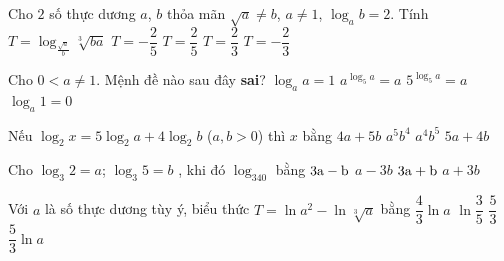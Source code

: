 \begin{ex}%
	Cho $2$ số thực dương $a$, $b$ thỏa mãn $\sqrt{a} \ne b$, $a\ne 1$, $\log_a b=2$. Tính $T=\log _{\tfrac{\sqrt{a}}{b}} \sqrt[3]{ba}$ 
	 \choice
		{$T=-\dfrac{2}{5}$} 
		{$T=\dfrac{2}{5}$} 
		 {$T=\dfrac{2}{3}$}
		 {\True $T=-\dfrac{2}{3}$}
\end{ex}

\begin{ex}%
	Cho $0<a\ne 1$. Mệnh đề nào  sau đây {\bf sai}?
	\choice 
		{$\log_a a=1$} 
		{\True $a^{\log_5  a}=a$}
		{$5^{\log_5 a}=a$} 
		{$\log_a  1=0$}
\end{ex}

\begin{ex}%
	Nếu $\log_2x=5\log_2a+4\log_2b$ ($ a,b  > 0$) thì $ x$ bằng
	 \choice
		{$  4a+5b$}
		 {\True $a^5b^4$}
		{$a^4b^5$} 
		 {$ 5a+4b$}
\end{ex}

\begin{ex}%
	Cho $\log_3  2=a$; $\log_3 5=b$ , khi đó $\log_340$ bằng
	 \choice
		{$3\rm{a}-b$} 
		{$a-3b$} 
		 {\True $3\rm{a}+b$}
		 {$a+3b$}
\end{ex}

\begin{ex}%
	Với $a$ là số thực dương tùy ý, biểu thức $T=\ln  a^2-\ln\sqrt[3]{a}$ bằng
	 \choice
		{$\dfrac{4}{3}\ln  a$}
		 {$\ln\dfrac{3}{5}$}
		{$\dfrac{5}{3}$} 
		{\True  $\dfrac{5}{3}\ln a$}
\end{ex}

